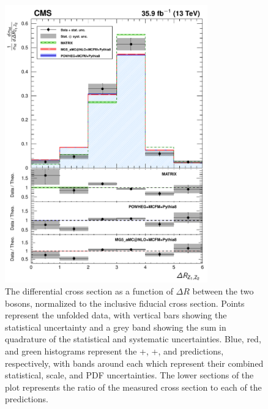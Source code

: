 \begin{figure}[htbp]
  \begin{center}
    \includegraphics[width=0.78\textwidth]{results/unfold_deltaRZZ.pdf}
    \caption[Normalized differential {\ZZ} cross section as a function of $\Delta R$ between the {\PZ} bosons]{
        The {\ZZ} differential cross section as a function of $\Delta R$ between the two {\PZ} bosons, normalized to the inclusive fiducial cross section.
        Points represent the unfolded data, with vertical bars showing the statistical uncertainty and a grey band showing the sum in quadrature of the statistical and systematic uncertainties.
        Blue, red, and green histograms represent the {\POWHEG}+{\MCFM}, {\MGAMC}+{\MCFM}, and {\MATRIX} predictions, respectively, with bands around each which represent their combined statistical, scale, and PDF uncertainties.
        The lower sections of the plot represents the ratio of the measured cross section to each of the predictions.
      }\label{fig:unfold_deltaRZZ}
  \end{center}
\end{figure}

